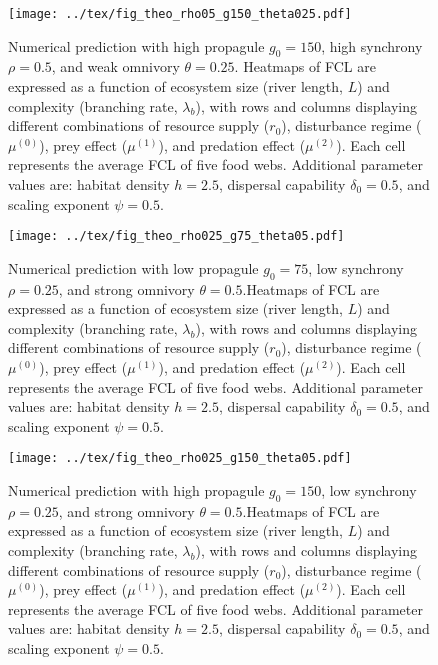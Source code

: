 \newpage

\begin{figure}
\centering
\texttt{[image: ../tex/fig\_theo\_rho05\_g150\_theta025.pdf]}
\caption{Numerical prediction with high propagule \(g_0 = 150\), high
synchrony \(\rho = 0.5\), and weak omnivory \(\theta = 0.25\). Heatmaps
of FCL are expressed as a function of ecosystem size (river length,
\(L\)) and complexity (branching rate, \(\lambda_b\)), with rows and
columns displaying different combinations of resource supply (\(r_0\)),
disturbance regime (\(\mu^{(0)}\)), prey effect (\(\mu^{(1)}\)), and
predation effect (\(\mu^{(2)}\)). Each cell represents the average FCL
of five food webs. Additional parameter values are: habitat density
\(h=2.5\), dispersal capability \(\delta_0=0.5\), and scaling exponent
\(\psi=0.5\).}
\end{figure}

\newpage

\begin{figure}
\centering
\texttt{[image: ../tex/fig\_theo\_rho025\_g75\_theta05.pdf]}
\caption{Numerical prediction with low propagule \(g_0 = 75\), low
synchrony \(\rho = 0.25\), and strong omnivory \(\theta = 0.5\).Heatmaps
of FCL are expressed as a function of ecosystem size (river length,
\(L\)) and complexity (branching rate, \(\lambda_b\)), with rows and
columns displaying different combinations of resource supply (\(r_0\)),
disturbance regime (\(\mu^{(0)}\)), prey effect (\(\mu^{(1)}\)), and
predation effect (\(\mu^{(2)}\)). Each cell represents the average FCL
of five food webs. Additional parameter values are: habitat density
\(h=2.5\), dispersal capability \(\delta_0=0.5\), and scaling exponent
\(\psi=0.5\).}
\end{figure}

\newpage

\begin{figure}
\centering
\texttt{[image: ../tex/fig\_theo\_rho025\_g150\_theta05.pdf]}
\caption{Numerical prediction with high propagule \(g_0 = 150\), low
synchrony \(\rho = 0.25\), and strong omnivory \(\theta = 0.5\).Heatmaps
of FCL are expressed as a function of ecosystem size (river length,
\(L\)) and complexity (branching rate, \(\lambda_b\)), with rows and
columns displaying different combinations of resource supply (\(r_0\)),
disturbance regime (\(\mu^{(0)}\)), prey effect (\(\mu^{(1)}\)), and
predation effect (\(\mu^{(2)}\)). Each cell represents the average FCL
of five food webs. Additional parameter values are: habitat density
\(h=2.5\), dispersal capability \(\delta_0=0.5\), and scaling exponent
\(\psi=0.5\).}
\end{figure}

